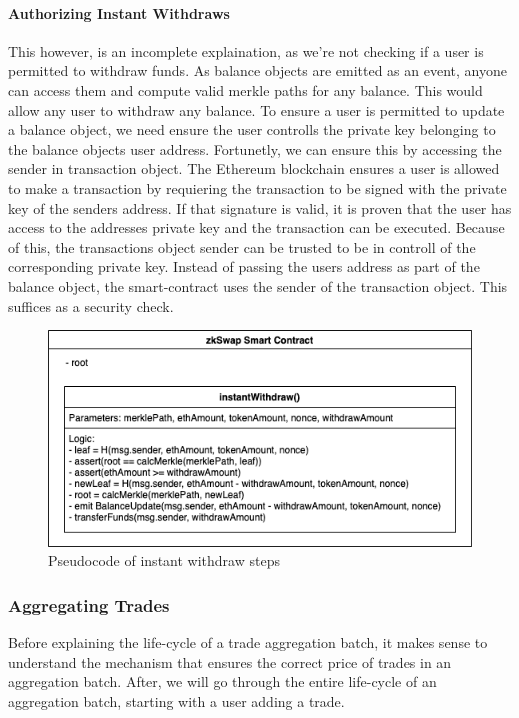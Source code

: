 \documentclass[../../thesis.tex]{subfiles}
\begin{document}
\paragraph{Authorizing Instant Withdraws}
This however, is an incomplete explaination, as we're not checking if a user is permitted to withdraw funds. As balance objects are emitted as an event, anyone can access them and compute valid merkle paths for any balance. This would allow any user to withdraw any balance. To ensure a user is permitted to update a balance object, we need ensure the user controlls the private key belonging to the balance objects user address. Fortunetly, we can ensure this by accessing the sender in transaction object. The Ethereum blockchain ensures a user is allowed to make a transaction by requiering the transaction to be signed with the private key of the senders address. If that signature is valid, it is proven that the user has access to the addresses private key and the transaction can be executed. Because of this, the transactions object sender can be trusted to be in controll of the corresponding private key. Instead of passing the users address as part of the balance object, the smart-contract uses the sender of the transaction object. This suffices as a security check.


\begin{figure}[h]
    \centerline{\includegraphics[totalheight=5cm]{diagrams/instantWithdraw.png}}
    \caption{Pseudocode of instant withdraw steps}
    \label{fig:instWith}
\end{figure}

\subsubsection{Aggregating Trades}
Before explaining the life-cycle of a trade aggregation batch, it makes sense to understand the mechanism that ensures the correct price of trades in an aggregation batch. After, we will go through the entire life-cycle of an aggregation batch, starting with a user adding a trade. 
\end{document}
